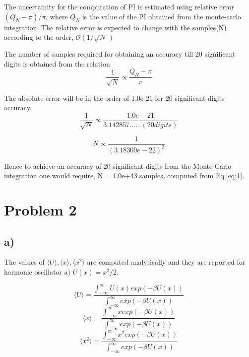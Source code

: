 \documentclass{article}
\begin{document}
The uncertainity for the computation of PI is estimated using relative error $(Q_{N}-\pi)/\pi$, where $Q_{N}$ is the value of the PI obtained from the monte-carlo integration. The relative error is expected to change with the samples(N) according to the order, $\mathscr{O(1/ \sqrt N)}$

The number of samples required for obtaining an accuracy till 20 significant digits is obtained from the relation $$ \frac{1}{\sqrt{N}} \propto \frac{Q_{N}-\pi}{\pi}$$

The absolute error will be in the order of 1.0e-21 for 20 significant digits accuracy.
\begin{equation}
\frac{1}{\sqrt{N}} \propto \frac{1.0e-21}{3.142857......(20 digits)}
\label{eq:1}
\end{equation}

\begin{equation}
N \propto \frac{1}{(3.18309e-22)^2}
\label{eq:2}
\end{equation}

Hence to achieve an accuracy of 20 significant digits from the Monte Carlo integration one would require, N = 1.0e+43 samples, computed from Eq.\ref{eq:1}.

\section{Problem 2}
\label{sec-2}
\subsection{a)}
\label{sec-2-1}

The values of $\langle U \rangle, \langle x \rangle, \langle x^2 \rangle$ are computed analytically and they are reported for harmonic oscillator a) $U(x) = x^2/2$.

\begin{equation}
\langle U \rangle = \frac{\int_{-\infty}^{\infty} U(x) exp(-\beta U(x))}{\int_{-\infty}^{\infty} exp(-\beta U(x))}
\label{eq:P2a}
\end{equation}
\begin{equation}
\langle x \rangle = \frac{\int_{-\infty}^{\infty} x exp(-\beta U(x))}{\int_{-\infty}^{\infty} exp(-\beta U(x))}
\label{eq:P2b}
\end{equation}
\begin{equation}
\langle x^2 \rangle = \frac{\int_{-\infty}^{\infty} x^2 exp(-\beta U(x))}{\int_{-\infty}^{\infty} exp(-\beta U(x))}
\label{eq:P2c}
\end{equation}
\end{document}

